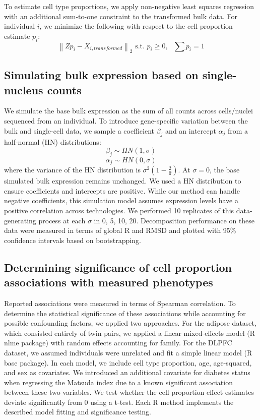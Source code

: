 To estimate cell type proportions, we apply non-negative least squares regression with an additional sum-to-one constraint to the transformed bulk data. For individual $i$, we minimize the following with respect to the cell proportion estimate $p_i$:
\begin{equation}
    \left\lVert Zp_i - X_{i,transformed} \right\rVert_2 \text{ s.t. } p_i \geq 0,\text{ } \sum p_i = 1 
\end{equation}

\subsection{Simulating bulk expression based on single-nucleus counts}

We simulate the base bulk expression as the sum of all counts across cells/nuclei sequenced from an individual. To introduce gene-specific variation between the bulk and single-cell data, we sample a coefficient $\beta_j$ and an intercept $\alpha_j$ from a half-normal (HN) distributions:
\begin{equation}
    \beta_j \sim HN(1,\sigma)
\end{equation}
\begin{equation}
    \alpha_j \sim HN(0,\sigma)
\end{equation}
where the variance of the HN distribution is $\sigma^2(1-\frac{2}{\pi})$. At $\sigma = 0$, the base simulated bulk expression remains unchanged. We used a HN distribution to ensure coefficients and intercepts are positive. While our method can handle negative coefficients, this simulation model assumes expression levels have a positive correlation across technologies. We performed 10 replicates of this data-generating process at each $\sigma$ in 0, 5, 10, 20. Decomposition performance on these data were measured in terms of global R and RMSD and plotted with 95\% confidence intervals based on bootstrapping. 

\subsection{Determining significance of cell proportion associations with measured phenotypes}

Reported associations were measured in terms of Spearman correlation. To determine the statistical significance of these associations while accounting for possible confounding factors, we applied two approaches. For the adipose dataset, which consisted entirely of twin pairs, we applied a linear mixed-effects model (R nlme package) with random effects accounting for family. For the DLPFC dataset, we assumed individuals were unrelated and fit a simple linear model (R base package). In each model, we include cell type proportion, age, age-squared, and sex as covariates. We introduced an additional covariate for diabetes status when regressing the Matsuda index due to a known significant association between these two variables. We test whether the cell proportion effect estimates deviate significantly from 0 using a t-test. Each R method implements the described model fitting and significance testing.

